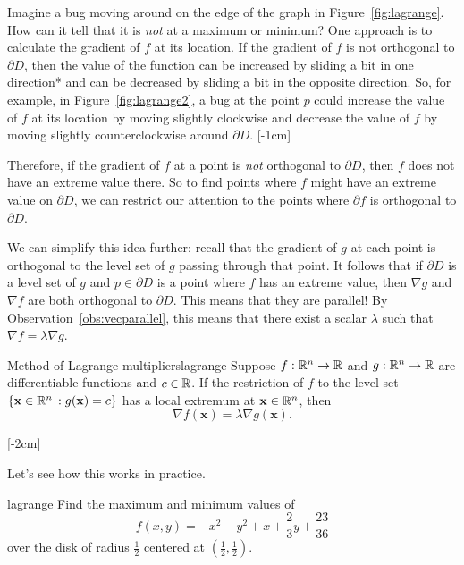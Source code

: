 \documentclass[svgnames]{report}
\begin{document}
  Imagine a bug moving around on the edge of the graph in
  Figure~\ref{fig:lagrange}. How can it tell that it is \textit{not} at a
  maximum or minimum? One approach is to calculate the gradient of $f$
  at its location. If the gradient of $f$ is not orthogonal to
  $\partial D$, then the value of the function can be increased by
  sliding a bit in one direction* and can be decreased by sliding a bit
  in the opposite direction. So, for example, in
  Figure~\ref{fig:lagrange2}, a bug at the point $p$ could increase
  the value of $f$ at its location by moving slightly clockwise and
  decrease the value of $f$ by moving slightly counterclockwise around
  $\partial D$. [-1cm]

  Therefore, if the gradient of $f$ at a point is \textit{not}
  orthogonal to $\partial D$, then $f$ does not have an extreme
  value there. So to find points where $f$ might have an extreme value
  on $\partial D$, we can restrict our attention to the points where
  $\partial f$ is orthogonal to $\partial D$.

  We can simplify this idea further: recall that the gradient of $g$ at
  each point is orthogonal to the level set of $g$ passing through
  that point. It follows that if $\partial D$ is a level set of $g$ 
  and $p \in \partial D$ is a point where $f$ has an extreme value, then
  $\nabla g$ and $\nabla f$ are both orthogonal to $\partial
  D$. This means that they are parallel! By
  Observation~\ref{obs:vecparallel}, this means that there exist a scalar
  $\lambda$ such that $\nabla f = \lambda \nabla g$.

  \begin{theo}{Method of Lagrange multipliers}{lagrange}
    Suppose $f: \mathbb{R}^n \to \mathbb{R}$ and $g:\mathbb{R}^n \to \mathbb{R}$ are differentiable
    functions and $c \in \mathbb{R}$. If the restriction of $f$ to the level
    set $\{\mathbf{x} \in \mathbb{R}^n \,: g(\mathbf{x}) = c\}$ has a local
    extremum at $\mathbf{x} \in \mathbb{R}^n$, then
    \[
      \nabla f (\mathbf{x}) = \lambda \nabla g (\mathbf{x}). 
    \]
  \end{theo} [-2cm]

  Let's see how this works in practice.

  \begin{example}{}{lagrange}
    Find the maximum and minimum values of
    \[f(x,y) = -x^2 - y^2 + x + \frac{2}{3} y + \frac{23}{36}\]
    over the disk of radius $\tfrac{1}{2}$ centered at $\left(
      \tfrac{1}{2}, \tfrac{1}{2}\right)$. 
  \end{example}
\end{document}
